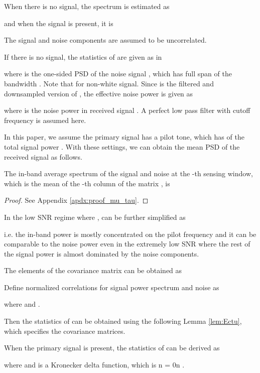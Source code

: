 \documentclass[draftclsnofoot,onecolumn,12pt]{IEEEtran}
\begin{document}
When there is no signal, the spectrum is estimated as

and when the signal is present, it is

The signal and noise components are assumed to be uncorrelated.

If there is no signal, the statistics of  are given as in \cite{ProakisBook96}

where  is the one-sided PSD of the noise signal , which has full span of the bandwidth . Note that  for non-white signal. Since  is the filtered and downsampled version of , the effective noise power is given as

where  is the noise power in received signal . A perfect low pass filter with cutoff frequency  is assumed here.

In this paper, we assume
the primary signal has a pilot tone, which has  of the total signal power .
With these settings, we can obtain the mean PSD of the received signal as follows.

\begin{lemma}\label{lem:mu_tau}
The in-band average spectrum of the signal and noise at the -th sensing window, which is the mean of the -th column of the matrix , is
  
\end{lemma}
\begin{proof}
  See Appendix \ref{apdx:proof_mu_tau}.
\end{proof}

In the low SNR regime where ,  can be further simplified as

i.e. the in-band power is mostly concentrated on the pilot frequency and it can be comparable to the noise power even in the extremely low SNR where the rest of the signal power is almost dominated by the noise components.


The elements of the covariance matrix  can be obtained as


Define normalized correlations for signal power spectrum and noise as

where  and .

Then the statistics of  can be obtained using the following Lemma \ref{lem:Ectu}, which specifies the covariance matrices. 
\begin{lemma}\label{lem:Ectu}
When the primary signal is present, the statistics of  can be derived as
  
  where  and
	 is a Kronecker delta function, which is n = 0n .
\end{lemma}
\end{document}
